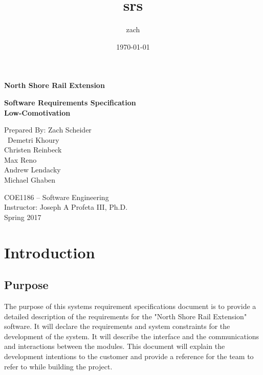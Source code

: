 \documentclass[11pt]{article}
\author{zach}
\date{\today}
\title{srs}
\renewcommand{\maketitle}{}
\begin{document}
\maketitle


\begin{titlepage}
    \begin{center}
        \vspace*{1cm}
        
        \Huge
        \textbf{North Shore Rail Extension}

        \vspace{2.5cm}
        \textbf{Software Requirements Specification \\}
        \vspace{2.5cm}
        \textbf{Low-Comotivation}
        \vspace{2.5cm}

    \end{center}

    \begin{flushright}        
        \Large
        Prepared By: Zach Scheider \\\ Demetri Khoury \\
        Christen Reinbeck \\ Max Reno \\ Andrew Lendacky
        \\ Michael Ghaben
    \end{flushright}        

        \vfill
    \begin{center}        
        
        \vspace{0.8cm}        

        \Large
        COE1186 – Software Engineering\\
        Instructor: Joseph A Profeta III, Ph.D.\\
        Spring 2017
        
    \end{center}
\end{titlepage}

\setcounter{tocdepth}{3}
\tableofcontents
\cleardoublepage

\section{Introduction}
\label{sec-1}
\subsection{Purpose}
\label{sec-1-1}
The purpose of this systems requirement specifications document is to provide a detailed description of the requirements for the "North Shore Rail Extension" software. It will declare the requirements and system constraints for the development of the system. It will describe the interface and the communications and interactions between the modules. This document will explain the development intentions to the customer and provide a reference for the team to refer to while building the project.
\end{document}
